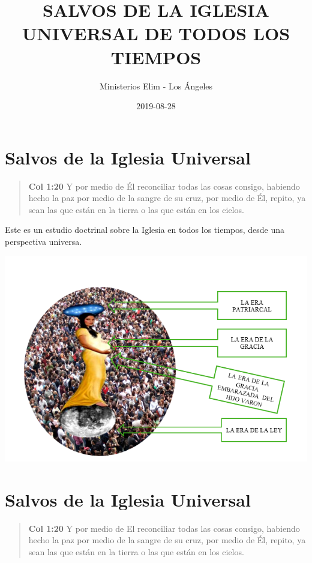 \documentclass[]{book}
\title{SALVOS DE LA IGLESIA UNIVERSAL DE TODOS LOS TIEMPOS}
\author{Ministerios Elim - Los Ángeles}
\date{2019-08-28}
\begin{document}
\maketitle

{
\setcounter{tocdepth}{1}
\tableofcontents
}
\hypertarget{salvos-de-la-iglesia-universal}{%
\chapter{Salvos de la Iglesia Universal}\label{salvos-de-la-iglesia-universal}}

\begin{quote}
\textbf{Col 1:20} Y por medio de Él reconciliar todas las cosas consigo, habiendo hecho la paz por medio de la sangre de su cruz, por medio de Él, repito, ya sean las que están en la tierra o las que están en los cielos.
\end{quote}

Este es un estudio doctrinal sobre la Iglesia en todos los tiempos, desde una perspectiva universa.

\includegraphics{static/iglesia_universal.png}

\hypertarget{salvos-de-la-iglesia-universal-1}{%
\chapter{Salvos de la Iglesia Universal}\label{salvos-de-la-iglesia-universal-1}}

\begin{quote}
\textbf{Col 1:20} Y por medio de El reconciliar todas las cosas consigo, habiendo hecho la paz por medio de la sangre de su cruz, por medio de Él, repito, ya sean las que están en la tierra o las que están en los cielos.
\end{quote}
\end{document}
